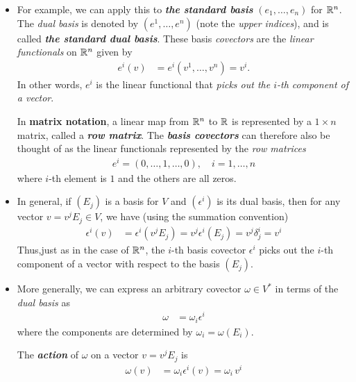 \documentclass[11pt]{article}
\begin{document}
\begin{itemize}
\item \begin{example}
For example, we can apply this to \emph{\textbf{the standard basis}} $(e_1, \ldots, e_n)$ for ${\mathbb R}^n$. The \emph{dual basis} is denoted by $(e^1,\ldots,e^n)$ (note the \emph{upper indices}), and is called \emph{\textbf{the standard dual basis}}. These basis \emph{covectors} are the \emph{linear functionals} on ${\mathbb R}^n$ given by
\begin{align}
e^{i}(v) &= e^{i}(v^1,\ldots, v^{n}) = v^{i}. \label{eqn: covector_basis_vector_basis}
\end{align} In other words, $e^i$ is the linear functional that \emph{picks out the $i$-th component of a vector}. 

In \textbf{matrix notation}, a linear map from ${\mathbb R}^n$ to ${\mathbb R}$ is represented by a $1 \times n$ matrix, called a \emph{\textbf{row matrix}}. The \emph{\textbf{basis covectors}} can therefore also be thought of as the linear functionals represented by the \emph{row matrices}
\begin{align}
e^{i} = (0,\ldots, 1, \ldots, 0), \quad i=1,\ldots, n \label{eqn: covector_basis_row_mat}
\end{align} where $i$-th element is $1$ and the others are all zeros.
\end{example}

\item In general, if $(E_j)$ is a basis for $V$ and $(\epsilon^i)$ is its dual basis, then for any vector
$v = v^j E_j \in V$, we have (using the summation convention)
\begin{align*}
\epsilon^{i}(v) &= \epsilon^{i}(v^j E_j) = v^j \epsilon^{i}(E_j) = v^j \delta_{j}^{i} = v^{i}
\end{align*} Thus,just as in the case of ${\mathbb R}^n$, the $i$-th basis covector $\epsilon^i$ picks out the $i$-th component of a vector with respect to the basis $(E_j)$.

\item  More generally, we can express an arbitrary covector $\omega \in V^{*}$ in terms of the \emph{dual basis} as
\begin{align}
\omega & = \omega_i \epsilon^{i} \label{eqn: covector_linear_reprsent_via_basis}
\end{align} where the components are determined by $\omega_i = \omega(E_i)$. 

The \emph{\textbf{action}} of $\omega$ on a vector $v = v^j E_j$ is
\begin{align}
\omega(v) &= \omega_i \epsilon^{i}(v) = \omega_i\, v^{i} \label{eqn: covector_act_on_vector}
\end{align}


\end{itemize}
\end{document}
